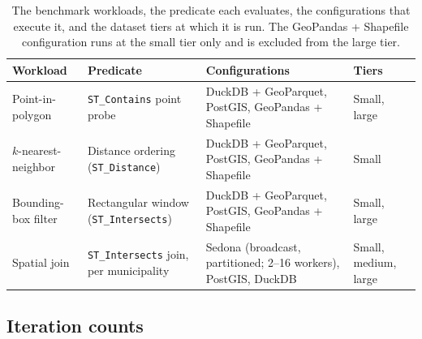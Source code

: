 \begin{table}[H]
    \centering
    \footnotesize
    \setlength{\tabcolsep}{6pt}
    \renewcommand{\arraystretch}{1.2}
    \begin{tabularx}{\textwidth}{@{}l >{\raggedright\arraybackslash}X >{\raggedright\arraybackslash}X l@{}}
        \toprule
        \textbf{Workload} & \textbf{Predicate} & \textbf{Configurations} & \textbf{Tiers} \\
        \midrule
        Point-in-polygon     & \texttt{ST\_Contains} point probe              & DuckDB + GeoParquet, PostGIS, GeoPandas + Shapefile & Small, large \\
        $k$-nearest-neighbor & Distance ordering (\texttt{ST\_Distance})      & DuckDB + GeoParquet, PostGIS, GeoPandas + Shapefile & Small \\
        Bounding-box filter  & Rectangular window (\texttt{ST\_Intersects})   & DuckDB + GeoParquet, PostGIS, GeoPandas + Shapefile & Small, large \\
        \midrule
        Spatial join         & \texttt{ST\_Intersects} join, per municipality & Sedona (broadcast, partitioned; \numrange{2}{16} workers), PostGIS, DuckDB       & Small, medium, large \\
        \bottomrule
    \end{tabularx}
    \caption[Benchmark workloads.]{The benchmark workloads, the predicate each evaluates, the configurations that execute it, and the dataset tiers at which it is run. The GeoPandas + Shapefile configuration runs at the small tier only and is excluded from the large tier.}
    \label{tab:workload-matrix}
\end{table}

\subsection{Iteration counts}
\label{research-design-and-methodology:workloads:iteration-counts}

